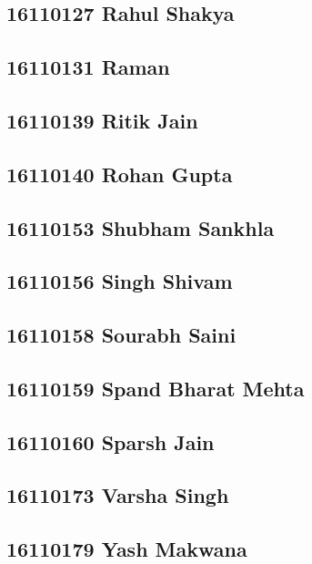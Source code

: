 \documentclass[journal=jpcbfk,manuscript=article]{achemso}
\begin{document}
\subsection {16110127	Rahul Shakya}

\subsection {16110131	Raman}

\subsection {16110139	Ritik Jain}

\subsection {16110140	Rohan Gupta}

\subsection {16110153	Shubham Sankhla}

\subsection {16110156	Singh Shivam}

\subsection {16110158	Sourabh Saini}

\subsection {16110159	Spand Bharat Mehta}

\subsection {16110160	Sparsh Jain}

\subsection {16110173	Varsha Singh}

\subsection {16110179	Yash Makwana}


%
%
\end{document}
